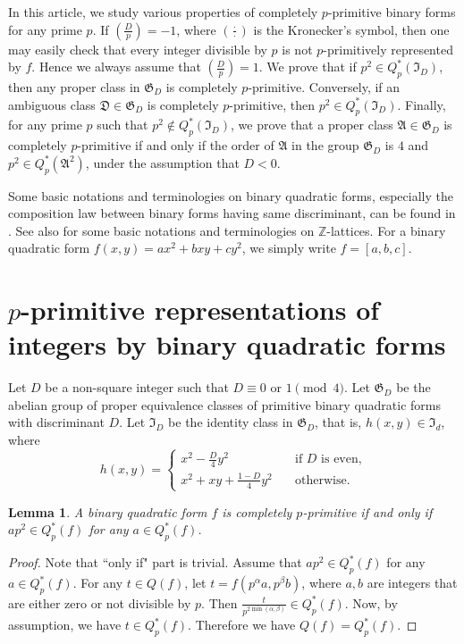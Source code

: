 \documentclass{amsart}
\newtheorem{lem}[thm]{Lemma}
\theoremstyle{definition}
\theoremstyle{remark}
\numberwithin{equation}{section}
\begin{document}
 In this article, we study various properties of completely $p$-primitive binary forms for any prime $p$. If $\left(\frac Dp\right)=-1$, where $\left(\frac{\cdot}{\cdot}\right)$ is the Kronecker's symbol, then one may easily check that every integer divisible by $p$ is not $p$-primitively represented by $f$.  Hence we always assume that $\left(\frac Dp\right)=1$.   We prove that if  $p^2 \in Q_p^*(\mathfrak I_D)$, then any proper class in $\mathfrak G_D$ is completely $p$-primitive. Conversely, if an ambiguous class $\mathfrak D \in \mathfrak G_D$ is completely $p$-primitive, then $p^2 \in Q_p^*(\mathfrak I_D)$.  Finally, for any prime $p$ such that $p^2 
  \not \in Q_p^*(\mathfrak I_D)$, we prove that a proper class $\mathfrak A \in \mathfrak G_D$ is completely $p$-primitive if and only if the order of $\mathfrak A$ in the group $\mathfrak G_D$ is  $4$ and  $p^2 \in Q_p^*(\mathfrak A^2)$, under the assumption that $D<0$. 
  
  Some  basic notations and terminologies on binary quadratic forms, especially the composition law between binary forms having same discriminant,  can be found in \cite{Cas}. See also \cite{OM} for some  basic notations and terminologies on ${{\mathbb Z}}$-lattices. For a binary quadratic form $f(x,y)=ax^2+bxy+cy^2$,  we simply write $f=[a,b,c]$.  

\section{$p$-primitive representations of integers by binary quadratic forms}

Let $D$ be a non-square integer such that $D \equiv 0$  or $1 \pmod 4$. Let $\mathfrak G_D$ be the abelian group  of proper equivalence classes of primitive binary quadratic forms with discriminant $D$.  Let $\mathfrak I_D$ be the identity class in $\mathfrak G_D$, that is, $h(x,y) \in \mathfrak I_d$, where 
$$
h(x,y)=\begin{cases} x^2-\frac D4 y^2  \quad &\text{if $D$ is even,}\\  
x^2+xy+\frac{1-D}4y^2  \quad &\text{otherwise}.\end{cases}
$$

   
\begin{lem} \label{down} A binary quadratic form $f$ is completely $p$-primitive if and only if 
$ap^2 \in Q_p^*(f)$ for any $a \in Q_p^*(f)$. 
\end {lem} 

\begin{proof}  Note that ``only if" part is trivial. Assume that $ap^2 \in Q_p^*(f)$ for any $a \in Q_p^*(f)$. For any $t \in Q(f)$, let $t=f(p^{\alpha}a,p^{\beta}b)$, where $a,b$ are integers  that  are either zero or not divisible by $p$. Then $\frac t{p^{2\min(\alpha,\beta)}} \in Q_p^*(f)$. Now, by assumption, we have  $t \in Q_p^*(f)$.  Therefore we have $Q(f)=Q_p^*(f)$.
\end{proof}
\end{document}
